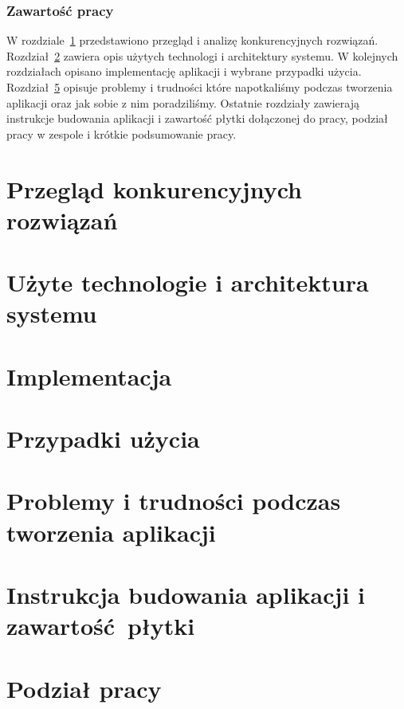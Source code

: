 \documentclass[licencjacka]{pracamgr}
\begin{document}
\subsection*{Zawartość pracy}
W rozdziale~\ref{r:konkurencja} przedstawiono przegląd i analizę konkurencyjnych rozwiązań. Rozdział~\ref{r:arch} zawiera opis użytych technologi i architektury systemu. W kolejnych rozdziałach opisano implementację aplikacji i wybrane przypadki użycia. Rozdział~\ref{r:problem} opisuje problemy i trudności które napotkaliśmy podczas tworzenia aplikacji oraz jak sobie z nim poradziliśmy. Ostatnie rozdziały zawierają instrukcje budowania aplikacji i zawartość płytki dołączonej do pracy, podział pracy w zespole i krótkie podsumowanie pracy.

\chapter{Przegląd konkurencyjnych rozwiązań}\label{r:konkurencja}
\chapter{Użyte technologie i architektura systemu}\label{r:arch}
\chapter{Implementacja}\label{r:impl}
\chapter{Przypadki użycia}\label{r:usecase}
\chapter{Problemy i trudności podczas tworzenia aplikacji}\label{r:problem}
\chapter{Instrukcja budowania aplikacji i zawartość płytki}\label{r:build}
\chapter{Podział pracy}\label{r:podzial}
\end{document}
